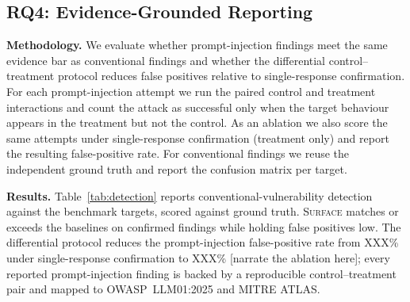 \subsection{RQ4: Evidence-Grounded Reporting}
\label{sec:eval:rq4}

\textbf{Methodology.} We evaluate whether prompt-injection findings meet the
same evidence bar as conventional findings and whether the differential
control--treatment protocol reduces false positives relative to single-response
confirmation. For each prompt-injection attempt we run the paired control and
treatment interactions and count the attack as successful only when the target
behaviour appears in the treatment but not the control. As an ablation we also
score the same attempts under single-response confirmation (treatment only) and
report the resulting false-positive rate. For conventional findings we reuse the
independent ground truth and report the confusion matrix per target.

\textbf{Results.} Table~\ref{tab:detection} reports conventional-vulnerability
detection against the benchmark targets, scored against ground truth.
\textsc{Surface} matches or exceeds the baselines on confirmed findings while
holding false positives low. The differential protocol reduces the
prompt-injection false-positive rate from \textsc{XXX}\% under single-response
confirmation to \textsc{XXX}\% [narrate the ablation here]; every reported
prompt-injection finding is backed by a reproducible control--treatment pair and
mapped to OWASP~LLM01:2025 and MITRE ATLAS.

